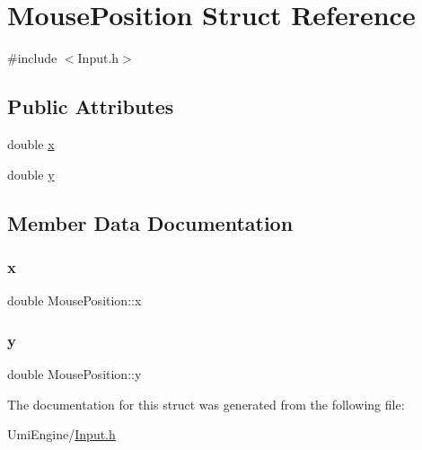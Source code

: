 \hypertarget{struct_mouse_position}{}\section{Mouse\+Position Struct Reference}
\label{struct_mouse_position}


{\ttfamily \#include $<$Input.\+h$>$}

\subsection*{Public Attributes}
\begin{DoxyCompactItemize}
\item 
double \mbox{\hyperlink{struct_mouse_position_a1a0256a32f6fb3d46ddf8452f4739d4a}{x}}
\item 
double \mbox{\hyperlink{struct_mouse_position_a572b3244d783ddda69cb074e3a296ed2}{y}}
\end{DoxyCompactItemize}


\subsection{Member Data Documentation}
\mbox{\label{struct_mouse_position_a1a0256a32f6fb3d46ddf8452f4739d4a}} 
\subsubsection{\texorpdfstring{x}{x}}
{\footnotesize\ttfamily double Mouse\+Position\+::x}

\mbox{\label{struct_mouse_position_a572b3244d783ddda69cb074e3a296ed2}} 
\subsubsection{\texorpdfstring{y}{y}}
{\footnotesize\ttfamily double Mouse\+Position\+::y}



The documentation for this struct was generated from the following file\+:\begin{DoxyCompactItemize}
\item 
Umi\+Engine/\mbox{\hyperlink{_input_8h}{Input.\+h}}\end{DoxyCompactItemize}
